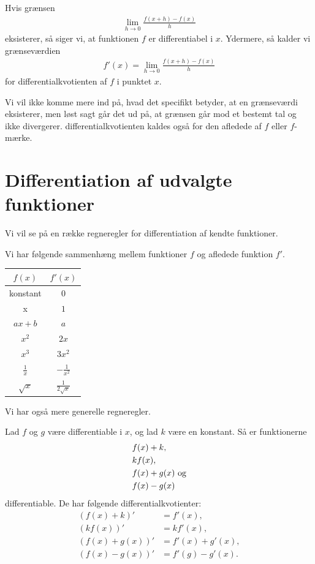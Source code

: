 \begin{defn}
Hvis grænsen 
\begin{align*}
\lim_{h\to 0} \frac{f(x+h)-f(x)}{h}
\end{align*}
eksisterer, så siger vi, at funktionen $f$ er differentiabel i $x$. Ydermere, så kalder vi grænseværdien 
\begin{align*}
f'(x) = \lim_{h\to 0} \frac{f(x+h)-f(x)}{h}
\end{align*}
for differentialkvotienten af $f$ i punktet $x$. 
\end{defn}
Vi vil ikke komme mere ind på, hvad det specifikt betyder, at en grænseværdi eksisterer, men løst sagt går det ud på, at grænsen går mod et bestemt tal og ikke divergerer. 
differentialkvotienten kaldes også for den afledede af $f$ eller $f$-mærke. 
\section*{Differentiation af udvalgte funktioner}
Vi vil se på en række regneregler for differentiation af kendte funktioner. 
\begin{setn}
Vi har følgende sammenhæng mellem funktioner $f$ og afledede funktion $f'$.
\begin{center}
\begin{tabular}{c|c}
$f(x)$& $f'(x)$\\
\hline
\textnormal{konstant}&$0$\\
\hline
x&$1$\\
\hline
$ax+b$&$a$\\
\hline
$x^2$&$2x$\\
\hline
$x^3$&$3x^2$\\
\hline
$\frac{1}{x}$&$-\frac{1}{x^2}$\\
\hline
$\sqrt{x}$&$\frac{1}{2\sqrt{x}}$
\end{tabular}
\end{center}
\end{setn}
Vi har også mere generelle regneregler.
\begin{setn}
Lad $f$ og $g$ være differentiable i $x$, og lad $k$ være en konstant. Så er funktionerne
\begin{align*}
&f(x) + k,\\
&kf(x),\\
&f(x)+g(x) \textnormal{ og}\\
&f(x)-g(x)
\end{align*}
differentiable. De har følgende differentialkvotienter:
\begin{align*}
(f(x)+k)'&= f'(x),\\
(kf(x))' &= kf'(x),\\
(f(x)+g(x))' &= f'(x)+g'(x),\\
(f(x)-g(x))' &= f'(g)-g'(x).
\end{align*}
\end{setn}
